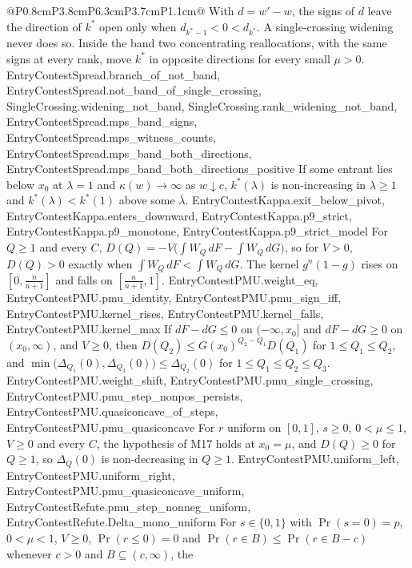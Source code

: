 \begin{longtable}{@{}P{0.8cm}P{3.8cm}P{6.3cm}P{3.7cm}P{1.1cm}@{}}
  {With $d=w'-w$, the signs of $d$ leave the direction of $k^*$ open only when
  $d_{k^*-1}<0<d_{k^*}$. A single-crossing widening never does so. Inside the band
  two concentrating reallocations, with the same signs at every rank, move $k^*$
  in opposite directions for every small $\mu>0$.}
  {EntryContestSpread.branch_of_not_band, EntryContestSpread.not_band_of_single_crossing, SingleCrossing.widening_not_band, SingleCrossing.rank_widening_not_band, EntryContestSpread.mps_band_signs, EntryContestSpread.mps_witness_counts, EntryContestSpread.mps_band_both_directions, EntryContestSpread.mps_band_both_directions_positive}
  {If some entrant lies below $x_0$ at $\lambda=1$ and $\kappa(w)\to\infty$ as
  $w\downarrow c$, $k^*(\lambda)$ is non-increasing in $\lambda\ge1$ and
  $k^*(\lambda)<k^*(1)$ above some $\bar\lambda$.}
  {EntryContestKappa.exit_below_pivot, EntryContestKappa.enters_downward, EntryContestKappa.p9_strict, EntryContestKappa.p9_monotone, EntryContestKappa.p9_strict_model}
  {For $Q\ge1$ and every $C$, $D(Q)=-V\big(\int W_Q\,dF-\int W_Q\,dG\big)$, so for
  $V>0$, $D(Q)>0$ exactly when $\int W_Q\,dF<\int W_Q\,dG$. The kernel
  $g^n(1-g)$ rises on $[0,\frac n{n+1}]$ and falls on $[\frac n{n+1},1]$.}
  {EntryContestPMU.weight_eq, EntryContestPMU.pmu_identity, EntryContestPMU.pmu_sign_iff, EntryContestPMU.kernel_rises, EntryContestPMU.kernel_falls, EntryContestPMU.kernel_max}
  {If $dF-dG\le0$ on $(-\infty,x_0]$ and $dF-dG\ge0$ on $(x_0,\infty)$, and
  $V\ge0$, then $D(Q_2)\le G(x_0)^{Q_2-Q_1}D(Q_1)$ for $1\le Q_1\le Q_2$, and
  $\min\big(\Delta_{Q_1}(0),\Delta_{Q_3}(0)\big)\le\Delta_{Q_2}(0)$ for
  $1\le Q_1\le Q_2\le Q_3$.}
  {EntryContestPMU.weight_shift, EntryContestPMU.pmu_single_crossing, EntryContestPMU.pmu_step_nonpos_persists, EntryContestPMU.quasiconcave_of_steps, EntryContestPMU.pmu_quasiconcave}
  {For $r$ uniform on $[0,1]$, $s\ge0$, $0<\mu\le1$, $V\ge0$ and every $C$, the
  hypothesis of M17 holds at $x_0=\mu$, and $D(Q)\ge0$ for $Q\ge1$, so
  $\Delta_Q(0)$ is non-decreasing in $Q\ge1$.}
  {EntryContestPMU.uniform_left, EntryContestPMU.uniform_right, EntryContestPMU.pmu_quasiconcave_uniform, EntryContestRefute.pmu_step_nonneg_uniform, EntryContestRefute.Delta_mono_uniform}
  {For $s\in\{0,1\}$ with $\Pr(s=0)=p$, $0<\mu<1$, $V\ge0$, $\Pr(r\le0)=0$ and
  $\Pr(r\in B)\le\Pr(r\in B-c)$ whenever $c>0$ and $B\subseteq(c,\infty)$, the
}
\end{longtable}
